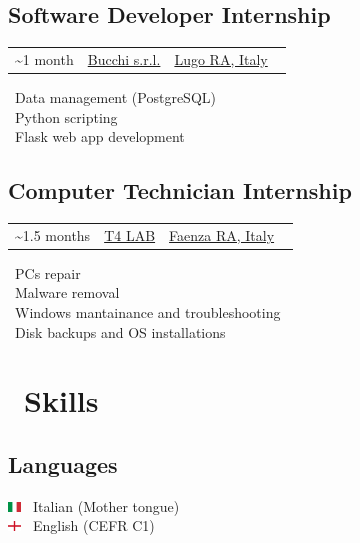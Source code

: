 \documentclass{article}
\makeatletter
\newcommand{\event}[3]{
    \begin{tabularx}{\linewidth}{@{}>{\raggedright\arraybackslash}X >{\centering\arraybackslash}X >{\raggedleft\arraybackslash}X@{}}
        #1 & #2 & #3
    \end{tabularx}
    \vspace{-10pt}
}
\makeatother
\begin{document}
\begin{paracol}{2}
    \begin{tcolorbox}
        \subsection*{Software Developer Internship}
        \event
            {\faCalendar* 2018 \textasciitilde 1 month}
            {\href{http://www.bucchi.it/en/}{Bucchi s.r.l.}}
            {\href{https://www.openstreetmap.org/relation/43140}{Lugo RA, Italy} \ \faCity}

        \tcblower

        \faDatabase \ Data management (PostgreSQL) \\
        \faPython \ Python scripting \\
        \faFlask \ Flask web app development
    \end{tcolorbox}

    \begin{tcolorbox}
        \subsection*{Computer Technician Internship}
        \event
            {\faCalendar* 2017 \textasciitilde 1.5 months}
            {\href{https://www.t4lab.it/}{T4 LAB}}
            {\href{https://www.openstreetmap.org/relation/43004}{Faenza RA, Italy} \ \faCity}

        \tcblower

        \faLaptop \ PCs repair \\
        \faShieldVirus \ Malware removal \\
        \faRecycle \ Windows mantainance and troubleshooting \\
        \faHdd \ Disk backups and OS installations
    \end{tcolorbox}


    \switchcolumn


    \section*{\faLightbulb \ Skills}

    \begin{tcolorbox}
        \subsection*{Languages}
        \includegraphics[width=10pt]{it} \ Italian (Mother tongue) \\
        \includegraphics[width=10pt]{gb-eng} \ English (CEFR C1)
    \end{tcolorbox}


\end{paracol}
\end{document}
